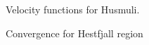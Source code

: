\documentclass[extra]{gji}
\begin{document}
\begin{figure}
	\caption{
		Velocity functions for Husmuli.
		}
\end{figure}

\begin{figure}
	\caption{
		Convergence for Hestfjall region
		}
\end{figure}
\end{document}
